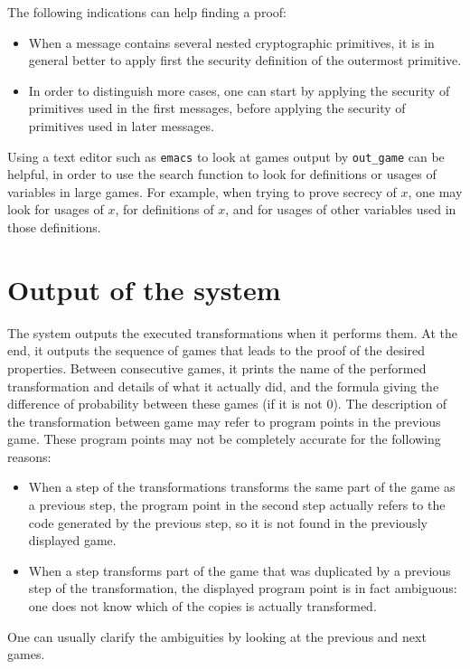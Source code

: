 \documentclass{article}
\begin{document}
The following indications can help finding a proof:
\begin{itemize}

\item When a message contains several nested cryptographic primitives,
it is in general better to apply first the security definition of the
outermost primitive.

\item In order to distinguish more cases, one can start by applying
the security of primitives used in the first messages, before applying
the security of primitives used in later messages.

\end{itemize}
Using a text editor such as \texttt{emacs} to look at games output
by \texttt{out\_game} can be
helpful, in order to use the search function to look for definitions
or usages of variables in large games.  For example, when trying to
prove secrecy of $x$, one may look for usages of $x$, for
definitions of $x$, and for usages of other variables used in those
definitions.

\section{Output of the system}

The system outputs the executed transformations when it performs
them. At the end, it outputs the sequence of games that leads to the
proof of the desired properties. Between consecutive games, it prints
the name of the performed transformation and details of what it
actually did, and the formula giving the difference of probability
between these games (if it is not 0).
The description of the transformation between game may refer to 
program points in the previous game. These program points may not be
completely accurate for the following reasons:
\begin{itemize}
\item When a step of the transformations transforms the same part of 
the game as a previous step, the program point in the second step actually
refers to the code generated by the previous step, so it is not found
in the previously displayed game.
\item When a step transforms part of the game that was duplicated by
a previous step of the transformation, the displayed program point
is in fact ambiguous: one does not know which of the copies is actually
transformed.
\end{itemize}
One can usually clarify the ambiguities by looking at the previous and
next games. 
\end{document}
